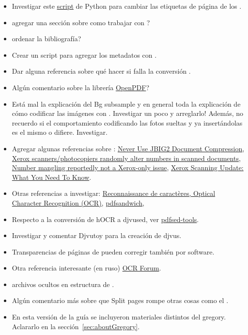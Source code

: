 \documentclass[%
	a5paper,
	10pt,
	twoside,
	openright,
	final,
]{memoir}
\begin{document}
\begin{itemize}
\begin{itemize}[noitemsep]
		\end{itemize}
	\item Investigar este \href{https://github.com/lovasoa/pagelabels-py}{script} de Python para cambiar las etiquetas de página de los \pdf.
	\item agregar una sección sobre como trabajar con \djvulibre?
	\item ordenar la bibliografía?
	\item Crear un script para agregar los metadatos con \exiftool.
	\item Dar alguna referencia sobre qué hacer si falla la conversión \pdfa.
	\item Algún comentario sobre la librería \href{https://github.com/LibrePDF/OpenPDF/}{OpenPDF}?
	\item Está mal la explicación del Bg subsample y en general toda la explicación de cómo codificar las imágenes con \djvusmallmod. Investigar un poco y arreglarlo! Además, no recuerdo si el comportamiento codificando las fotos sueltas y ya insertándolas es el mismo o difiere. Investigar.
	\item Agregar algunas referencias sobre \jbig: \href{http://everist.org/NobLog/20131122_an_actual_knob.htm}{Never Use JBIG2 Document Compression}, \href{http://www.dkriesel.com/en/blog/2013/0802_xerox-workcentres_are_switching_written_numbers_when_scanning}{Xerox scanners/photocopiers randomly alter numbers in scanned documents}, \href{http://www.dkriesel.com/en/blog/2013/0808_number_mangling_not_a_xerox-only_issue}{Number mangling reportedly not a Xerox-only issue}, \href{https://www.xerox.com/assets/pdf/ScanningQAincludingAppendixA.pdf}{Xerox Scanning Update: What You Need To Know}.
	\item Otras referencias a investigar: \href{http://www.meeus-d.be/linux/OCR.html}{Reconnaissance de caractères, Optical Character Recognition (OCR)}, \href{http://www.tobias-elze.de/pdfsandwich/}{pdfsandwich}, 
	\item Respecto a la conversión de hOCR a djvused, ver \href{https://github.com/ksa242/pdfsed-tools}{pdfsed-tools}.
	\item Investigar y comentar Djvutoy para la creación de djvus.
	\item Transparencias de páginas de pueden corregir también por software.
	\item Otra referencia interesante (en ruso) \href{http://publ.lib.ru/cgi/forum/YaBB.pl?catselect=ocr}{OCR Forum}.
	\item archivos ocultos en estructura de \abby.
	\item Algún comentario más sobre que Split pages rompe otras cosas como el \djvuimager.
	\item En esta versión de la guía se incluyeron materiales distintos del gregory. Aclararlo en la sección~\ref{sec:aboutGregory}.
\end{itemize}
\end{document}
